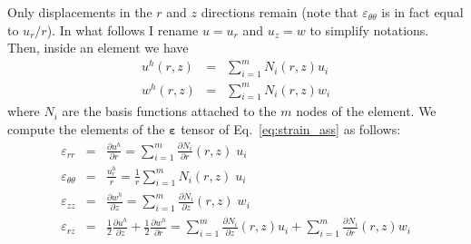 Only displacements in the $r$ and $z$ directions remain (note that $\varepsilon_{\theta\theta}$ is in fact equal to $u_r/r$). In what follows I rename $u=u_r$ and $u_z=w$ to simplify notations. 
Then, inside an element we have 
\begin{eqnarray}
u^h(r,z) &=& \sum_{i=1}^m N_i(r,z) u_i \nonumber\\
w^h(r,z) &=& \sum_{i=1}^m N_i(r,z) w_i
\end{eqnarray}
where $N_i$ are the basis functions attached 
to the $m$ nodes of the element.
We compute the elements of the ${\bm \varepsilon}$ tensor of Eq.~\eqref{eq:strain_ass} as follows:
\begin{eqnarray}
\varepsilon_{rr} &=&
\frac{\partial u^h}{\partial r} 
= \sum_{i=1}^m \frac{\partial N_i}{\partial r}(r,z) \; u_i \\
\varepsilon_{\theta\theta} &=& \frac{u_r^h}{r} = 
\frac{1}{r}\sum_{i=1}^m N_i(r,z) \;  u_i \\
\varepsilon_{zz} &=& 
\frac{\partial w^h}{\partial z}
= \sum_{i=1}^m \frac{\partial N_i}{\partial z}(r,z) \; w_i \\
\varepsilon_{rz} &=& \frac12\frac{\partial u^h}{\partial z}
+\frac12 \frac{\partial w^h}{\partial r}
= \sum_{i=1}^m \frac{\partial N_i}{\partial z}(r,z) u_i 
+ \sum_{i=1}^m \frac{\partial N_i}{\partial r}(r,z) w_i 
\end{eqnarray}

